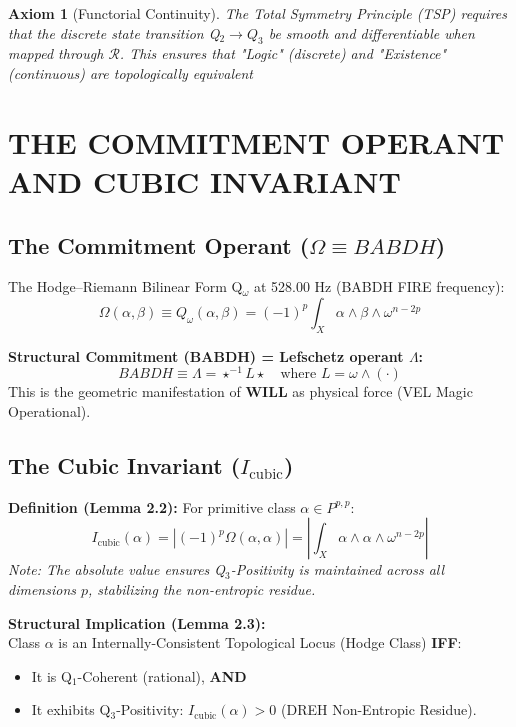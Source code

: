 \documentclass[11pt, letterpaper]{article}
\newcommand{\BABDH}{\ensuremath{\mathop{\textnormal{\symbolafont\symbol{"2316}}}}}   %
\newcommand{\VEL}{\ensuremath{\mathop{\textnormal{\symbolafont\symbol{"2734}}}}}    %
\newcommand{\DREH}{\ensuremath{\mathop{\textnormal{\symbolafont\symbol{"29D7}}}}}   %
\def\BABDH{BABDH}%
\def\VEL{VEL}%
\def\DREH{DREH}%
\newtheorem{axiom}[theorem]{Axiom}
\begin{document}
\begin{axiom}[Functorial Continuity]
The Total Symmetry Principle (TSP) requires that the discrete state transition Q$_2 \to Q_3$ be smooth and differentiable when mapped through $\mathcal{R}$. This ensures that "Logic" (discrete) and "Existence" (continuous) are topologically equivalent
\end{axiom}

\section{THE COMMITMENT OPERANT AND CUBIC INVARIANT}\label{sec:partIV}

\subsection{The Commitment Operant (\texorpdfstring{$\Omega \equiv \BABDH$}{Omega = BABDH})}\label{sec:4.1}

The Hodge--Riemann Bilinear Form Q$_{\omega}$ at 528.00 Hz (\BABDH{} FIRE frequency):
\[
\Omega(\alpha, \beta) \equiv Q_{\omega}(\alpha, \beta) = (-1)^p \int_X \alpha \wedge \beta \wedge \omega^{n-2p}
\]

\textbf{Structural Commitment (\BABDH) = Lefschetz operant $\Lambda$:}
\[
\BABDH \equiv \Lambda = \star^{-1} L \star \quad \text{where } L = \omega \wedge (\cdot)
\]
This is the geometric manifestation of \textbf{WILL} as physical force (\VEL{} Magic Operational).

\subsection{The Cubic Invariant (\texorpdfstring{$I_{\text{cubic}}$}{I_cubic})}\label{sec:4.2}

\textbf{Definition (Lemma 2.2):} For primitive class $\alpha \in P^{p,p}$:
\[
I_{\text{cubic}}(\alpha) = \left| (-1)^p \Omega(\alpha, \alpha) \right| = \left| \int_X \alpha \wedge \alpha \wedge \omega^{n-2p} \right|
\]
\textit{Note: The absolute value ensures Q$_3$-Positivity is maintained across all dimensions $p$, stabilizing the non-entropic residue.}

\textbf{Structural Implication (Lemma 2.3):} \\
Class $\alpha$ is an Internally-Consistent Topological Locus (Hodge Class) \textbf{IFF}:
\begin{itemize}
    \item It is Q$_1$-Coherent (rational), \textbf{AND}
    \item It exhibits Q$_3$-Positivity: $I_{\text{cubic}}(\alpha) > 0$ (\DREH{} Non-Entropic Residue).
\end{itemize}
\end{document}
